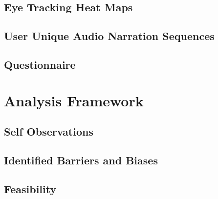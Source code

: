         \subsection{Eye Tracking Heat Maps}
        \subsection{User Unique Audio Narration Sequences}
        \subsection{Questionnaire}
    \section{Analysis Framework}
        \subsection{Self Observations}
        \subsection{Identified Barriers and Biases}
        \subsection{Feasibility}